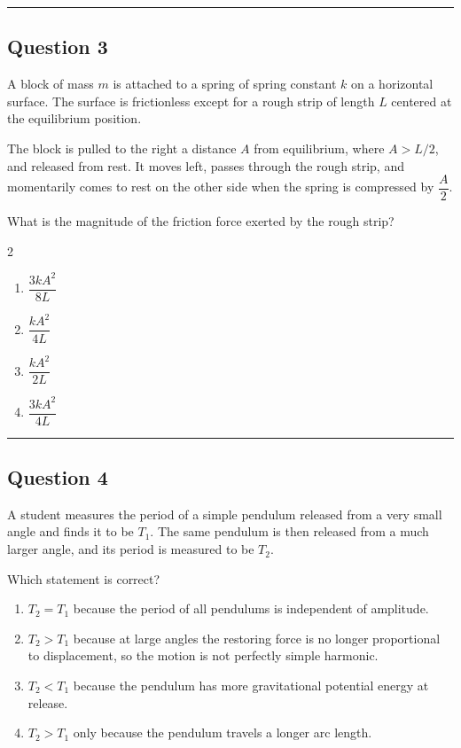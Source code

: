 \documentclass[12pt]{article}
\begin{document}
\hrule

\subsection*{Question 3}
A block of mass $m$ is attached to a spring of spring constant $k$ on a horizontal surface. The surface is frictionless except for a rough strip of length $L$ centered at the equilibrium position.

The block is pulled to the right a distance $A$ from equilibrium, where $A>L/2$, and released from rest. It moves left, passes through the rough strip, and momentarily comes to rest on the other side when the spring is compressed by $\dfrac{A}{2}$.

What is the magnitude of the friction force exerted by the rough strip?

\begin{multicols}{2}
\begin{enumerate}[label=\textbf{\Alph*.}]
\item $\dfrac{3kA^2}{8L}$
\item $\dfrac{kA^2}{4L}$
\item $\dfrac{kA^2}{2L}$
\item $\dfrac{3kA^2}{4L}$
\end{enumerate}
\end{multicols}

\hrule

\subsection*{Question 4}
A student measures the period of a simple pendulum released from a very small angle and finds it to be $T_1$. The same pendulum is then released from a much larger angle, and its period is measured to be $T_2$.

Which statement is correct?

\begin{enumerate}[label=\textbf{\Alph*.}]
\item $T_2=T_1$ because the period of all pendulums is independent of amplitude.
\item $T_2>T_1$ because at large angles the restoring force is no longer proportional to displacement, so the motion is not perfectly simple harmonic.
\item $T_2<T_1$ because the pendulum has more gravitational potential energy at release.
\item $T_2>T_1$ only because the pendulum travels a longer arc length.
\end{enumerate}
\end{document}
